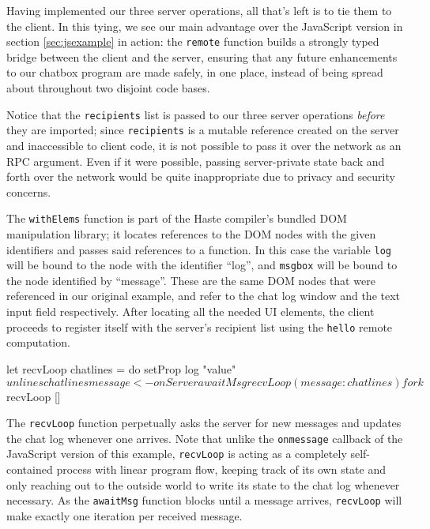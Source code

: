 \documentclass[preprint]{sigplanconf}
\begin{document}
Having implemented our three server operations, all that's left is to tie them
to the client. In this tying, we see our main advantage over the JavaScript
version in section \ref{sec:jsexample} in action: the \lstinline!remote!
function builds a strongly typed bridge between the client and the server,
ensuring that any future enhancements to our chatbox program are made safely,
in one place, instead of being spread about throughout two disjoint code bases.

\begin{code}
main :: App Done
main = do
  recipients <- liftServerIO $ CC.newMVar []

  hello <- remote $ srvHello recipients
  awaitMsg <- remote $ srvAwait recipients
  sendMsg <- remote $ srvSend recipients

  runClient $ do
    withElems ["log","message"] $ \[log,msgbox] -> do
      onServer hello
\end{code}

Notice that the \lstinline!recipients! list is passed to our three server
operations \emph{before} they are imported; since \lstinline!recipients! is
a mutable reference created on the server and inaccessible to client code,
it is not possible to pass it over the network as an RPC argument.
Even if it were possible, passing server-private state back and forth over the
network would be quite inappropriate due to privacy and security concerns.

The \lstinline!withElems! function is part of the Haste compiler's bundled DOM
manipulation library; it locates references to the DOM nodes with the given
identifiers and passes said references to a function.
In this case the variable \lstinline!log! will be bound to the node
with the identifier ``log'', and \lstinline!msgbox! will be bound to the node
identified by ``message''. These are the same DOM nodes that were referenced in
our original example, and refer to the chat log window and the text input
field respectively. After locating all the needed UI elements, the client
proceeds to register itself with the server's recipient list using the
\lstinline!hello! remote computation.

\begin{code}
      let recvLoop chatlines = do
            setProp log "value" $ unlines chatlines
            message <- onServer awaitMsg
            recvLoop (message : chatlines)
      fork $ recvLoop []
\end{code}

The \lstinline!recvLoop! function perpetually asks the server for new messages
and updates the chat log whenever one arrives. Note that unlike the
\lstinline!onmessage! callback of the JavaScript version of this example,
\lstinline!recvLoop! is acting as a completely self-contained process with
linear program flow, keeping track of its own state and only reaching out to
the outside world to write its state to the chat log whenever necessary. As
the \lstinline!awaitMsg! function blocks until a message arrives,
\lstinline!recvLoop! will make exactly one iteration per received message.
\end{document}
